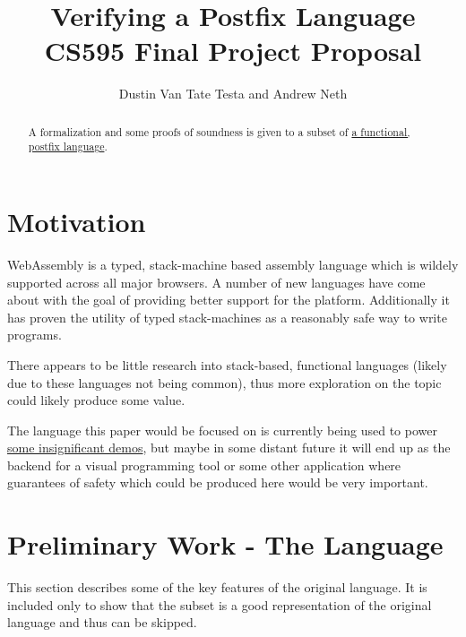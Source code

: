 \documentclass{article}
\title{Verifying a Postfix Language \\
    \large CS595 Final Project Proposal}
\author{Dustin Van Tate Testa and Andrew Neth}
\begin{document}
\maketitle
\begin{abstract}
A formalization and some proofs of soundness is given to a subset of \href{https://github.com/dvtate/postfix-haskell}{a functional, postfix language}.
\end{abstract}

\section{Motivation}
WebAssembly is a typed, stack-machine based assembly language which is wildely supported across all major browsers. A number of new languages have come about with the goal of providing better support for the platform. Additionally it has proven the utility of typed stack-machines as a reasonably safe way to write programs.

There appears to be little research into stack-based, functional languages (likely due to these languages not being common), thus more exploration on the topic could likely produce some value.

The language this paper would be focused on is currently being used to power \href{https://ridder.xyz/game}{some insignificant demos}, but maybe in some distant future it will end up as the backend for a visual programming tool or some other application where guarantees of safety which could be produced here would be very important.

\section{Preliminary Work - The Language}
This section describes some of the key features of the original language. It is included only to show that the subset is a good representation of the original language and thus can be skipped.
\end{document}

